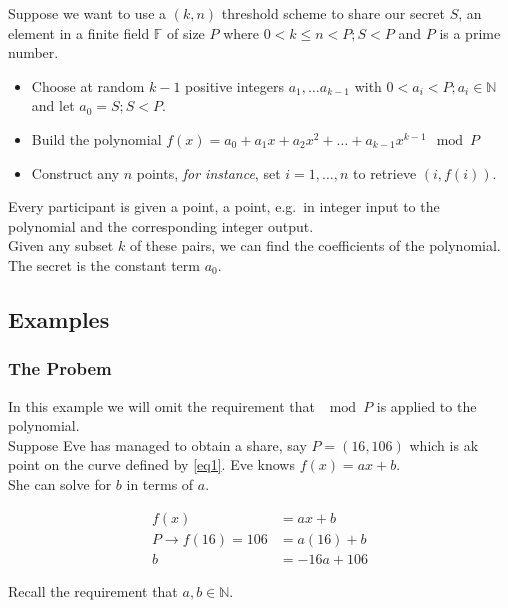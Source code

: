 \documentclass[preview,border=3mm]{article}
\begin{document}
\noindent
Suppose we want to use a $(k,n)$ threshold scheme to share our secret $S$, an
element in a finite field $\mathbb{F}$ of size $P$ where
$0 < k \leq n < P; S < P$ and $P$ is a prime number.

\begin{itemize}
    \item Choose at random $k-1$ positive integers $a_1, \ldots a_{k-1}$
        with $0 < a_i < P; a_i \in \mathbb{N}$ and let $a_0 = S; S < P$.
    \item Build the polynomial
        $f(x) = a_0 + a_1x + a_2x^2 + \ldots + a_{k-1}x^{k-1} \mod P$
    \item Construct any $n$ points, \emph{for instance}, set $i = 1, \ldots , n$
        to retrieve $(i, f(i))$.
\end{itemize}

\noindent
Every participant is given a point, a point, e.g.\ in integer input to the
polynomial and the corresponding integer output. \\

\noindent
Given any subset $k$ of these pairs, we can find the coefficients of the
polynomial. The secret is the constant term $a_0$.


\subsection{Examples}

\subsubsection{The Probem}
In this example we will omit the requirement that $\mod P$ is applied to
the polynomial. \\

\noindent
Suppose Eve has managed to obtain a share, say $P = (16, 106)$ which is ak
point on the curve defined by \ref{eq1}. Eve knows $f(x) = ax + b$. \\

\noindent
She can solve for $b$ in terms of $a$.

\begin{align}
    f(x) &= ax + b \nonumber \\
    P \rightarrow f(16) = 106 &= a(16) + b \nonumber \\
    b &= -16a + 106 \label{eq20}
\end{align}

\noindent
Recall the requirement that $a,b \in \mathbb{N}$.\\
\end{document}
